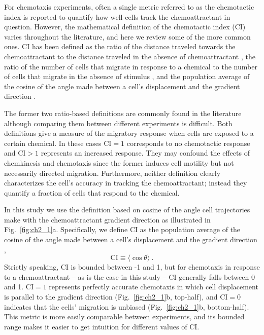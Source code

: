 For chemotaxis experiments, often a single metric referred to as the chemotactic index is reported to quantify how well cells track the chemoattractant in question. However, the mathematical definition of the chemotactic index (CI) varies throughout the literature, and here we review some of the more common ones. CI has been defined as the ratio of the distance traveled towards the chemoattractant to the distance traveled in the absence of chemoattractant \cite{nelson1975chemotaxis}, the ratio of the number of cells that migrate in response to a chemical to the number of cells that migrate in the absence of stimulus \cite{iellem2001unique,mayr2002vascular,fiedler2005vegf}, and the population average of the cosine of the angle made between a cell's displacement and the gradient direction
\cite{funamoto2001role,mouneimne2006spatial,van2007biased,kay2008changing}.

The former two ratio-based definitions are commonly found in the literature although comparing them between different experiments is difficult. Both definitions give a measure of the migratory response when cells are exposed to a certain chemical. In these cases $\text{CI} = 1$ corresponds to no chemotactic response and $\text{CI} > 1$ represents an increased response. They may confound the effects of chemkinesis and chemotaxis since the former induces cell motility but not necessarily directed migration. Furthermore, neither definition clearly characterizes the cell's accuracy in tracking the chemoattractant; instead they quantify a fraction of cells that respond to the chemical.

In this study we use the definition based on cosine of the angle cell trajectories make with the chemoattractant gradient direction as illustrated in Fig.\ \ref{fig:ch2_1}a. Specifically, we define CI as the population average of the cosine of the angle made between a cell's displacement and the gradient direction \cite{mouneimne2006spatial,kay2008changing,funamoto2001role},
\begin{equation}
    \text{CI} \equiv \langle \cos \theta \rangle \ .
\end{equation}
Strictly speaking, CI is bounded between -1 and 1, but for chemotaxis in response to a chemoattractant -- as is the case in this study -- CI generally falls between 0 and 1. $\text{CI} = 1$ represents perfectly accurate chemotaxis in which cell displacement is parallel to the gradient direction (Fig.\ \ref{fig:ch2_1}b, top-half), and $\text{CI} = 0$ indicates that the cells' migration is unbiased (Fig.\ \ref{fig:ch2_1}b, bottom-half). This metric is more easily comparable between experiments, and its bounded range makes it easier to get intuition for different values of CI.

